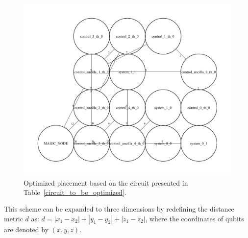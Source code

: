 \documentclass[a4paper,11pt]{ltjsarticle}
\begin{document}
{{        \begin{figure}[h]
            \centering
            \includegraphics[scale=0.40]{figure/final_state.pdf}
            \vspace{0pt}\caption{Optimized placement based on the circuit presented in Table~\ref{circuit_to_be_optimized}.}
            \label{final_state}
            \vspace{-10pt}
        \end{figure}

        This scheme can be expanded to three dimensions by redefining the distance metric $d$ as: $d = |x_1 - x_2| + |y_1 - y_2| + |z_1 - z_2|$, where the coordinates of qubits are denoted by $(x, y, z)$.
    }
}
\end{document}
